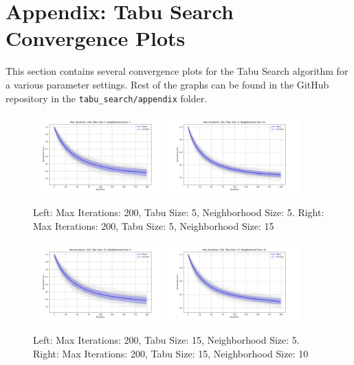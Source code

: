 \documentclass{article}
\begin{document}
    \section{Appendix: Tabu Search Convergence Plots}
    This section contains several convergence plots for the Tabu Search algorithm for a various parameter settings. Rest of the graphs can be found in the GitHub repository in the \texttt{tabu\_search/appendix} folder.

    \begin{figure}[H]
        \centering
        \includegraphics[width=0.45\textwidth]{tabu_search/appendix/max_iter_200_tabu_size_5_neighborhood_size_5.png}
        \includegraphics[width=0.45\textwidth]{tabu_search/appendix/max_iter_200_tabu_size_5_neighborhood_size_15.png}
        \caption{Left: Max Iterations: 200, Tabu Size: 5, Neighborhood Size: 5. Right: Max Iterations: 200, Tabu Size: 5, Neighborhood Size: 15}
        \label{fig:ts_200_5_5_5_15}
    \end{figure}

    \begin{figure}[H]
        \centering
        \includegraphics[width=0.45\textwidth]{tabu_search/appendix/max_iter_200_tabu_size_15_neighborhood_size_5.png}
        \includegraphics[width=0.45\textwidth]{tabu_search/appendix/max_iter_200_tabu_size_15_neighborhood_size_10.png}
        \caption{Left: Max Iterations: 200, Tabu Size: 15, Neighborhood Size: 5. Right: Max Iterations: 200, Tabu Size: 15, Neighborhood Size: 10}
        \label{fig:ts_200_15_5_15_10}
    \end{figure}
\end{document}
